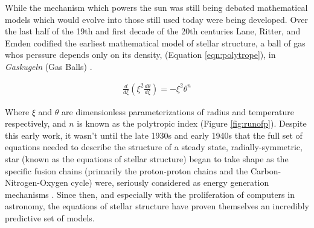 While the mechanism which powers the sun was still being debated mathematical
models which would evolve into those still used today were being developed.
Over the last half of the 19th and first decade of the 20th centuries Lane,
Ritter, and Emden codified the earliest mathematical model of stellar
structure, a ball of gas whos perssure depends only on its density, (Equation
\ref{eqn:polytrope}), in \textit{Gaskugeln} (Gas Balls) \citep{Emden1907}.

\begin{align}\label{eqn:polytrope}
	\frac{d}{d\xi}\left(\xi^{2}\frac{d\theta}{d\xi}\right) = -\xi^{2}\theta^{n}
\end{align}

Where $\xi$ and $\theta$ are dimensionless parameterizations of radius and
temperature respectively, and $n$ is known as the polytropic index (Figure
\ref{fig:runofp}). Despite this early work, it wasn't until the late 1930s and
early 1940s that the full set of equations needed to describe the structure of
a steady state, radially-symmetric, star (known as the equations of stellar
structure) began to take shape as the specific fusion chains (primarily the
proton-proton chains and the Carbon-Nitrogen-Oxygen cycle) were, seriously
considered as energy generation mechanisms \citep{Cowling1966}. Since then, and
especially with the proliferation of computers in astronomy, the equations of
stellar structure have proven themselves an incredibly predictive set of
models.  

